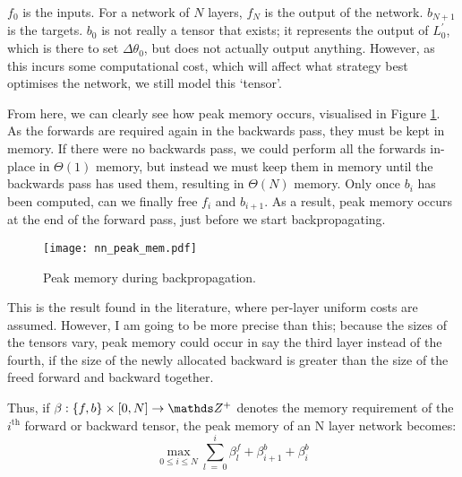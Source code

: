 \(f_0\) is the inputs. For a network of \(N\) layers, \(f_N\) is the output of the network. \(b_{N+1}\) is the targets. \(b_0\) is not really a tensor that exists; it represents the output of \(L^\prime_{0}\), which is there to set \(\Delta\theta_0\), but does not actually output anything. However, as this incurs some computational cost, which will affect what strategy best optimises the network, we still model this `tensor'.

From here, we can clearly see how peak memory occurs, visualised in Figure \ref{fig:2-nn-peak-mem}.
As the forwards are required again in the backwards pass, they must be kept in memory.
If there were no backwards pass, we could perform all the forwards in-place in \(\Theta(1)\) memory, but instead we must keep them in memory until the backwards pass has used them, resulting in \(\Theta(N)\) memory.
Only once \(b_i\) has been computed, can we finally free \(f_i\) and \(b_{i+1}\).
As a result, peak memory occurs at the end of the forward pass, just before we start backpropagating.

\begin{figure}[hp]
    \centering
    \texttt{[image: nn\_peak\_mem.pdf]}
    \caption{Peak memory during backpropagation.}
    \label{fig:2-nn-peak-mem}
\end{figure}

This is the result found in the literature, where per-layer uniform costs are assumed.
However, I am going to be more precise than this;
because the sizes of the tensors vary, peak memory could occur in say the third layer instead of the fourth, if the size of the newly allocated backward is greater than the size of the freed forward and backward together.

Thus, if \(\beta : \{f, b\}\times[0, N] \rightarrow \Z^+\) denotes the memory requirement of the \(i^{\mathrm{th}}\) forward or backward tensor, the peak memory of an N layer network becomes:
\begin{equation}
    \label{eqn:2-nn-peak-mem}
    \max_{0 \leq i \leq N} \sum_{l\;=\;0}^i \beta^f_l + \beta^b_{i+1} + \beta^b_i
\end{equation}
